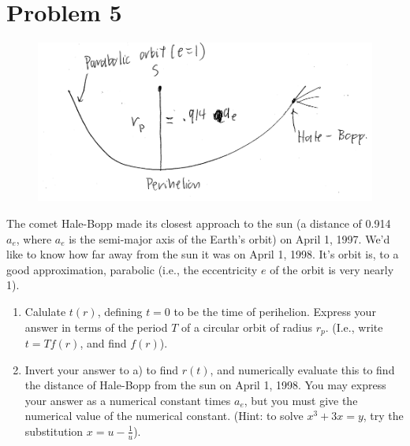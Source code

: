 \documentclass[12pt]{article}
\begin{document}
\section*{Problem 5}
\begin{figure}[H]
    \includegraphics{Problem5}
    \centering
\end{figure}
The comet Hale-Bopp made its closest approach to the sun (a distance of 0.914 $a_e$, where $a_e$ is the semi-major axis of the Earth's orbit) on April 1, 1997. We'd like to know how far away from the sun it was on April 1, 1998. It's orbit is, to a good approximation, parabolic (i.e., the eccentricity $e$ of the orbit is very nearly 1).
\begin{enumerate}[label=(\alph*)]
    \item Calulate $t(r)$, defining $t=0$ to be the time of perihelion. Express your answer in terms of the period $T$ of a circular orbit of radius $r_p$. (I.e., write $t=Tf(r)$, and find $f(r)$).
    \item Invert your answer to a) to find $r(t)$, and numerically evaluate this to find the distance of Hale-Bopp from the sun on April 1, 1998. You may express your answer as a numerical constant times $a_e$, but you must give the numerical value of the numerical constant. (Hint: to solve $x^3 + 3x = y$, try the substitution $x = u - \frac{1}{u}$).
\end{enumerate}
\end{document}
